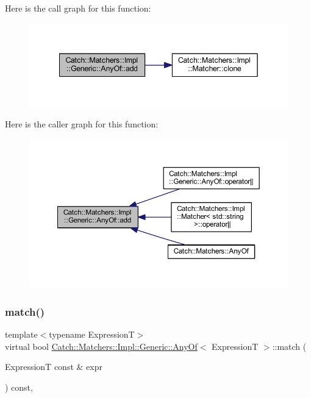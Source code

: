 Here is the call graph for this function\+:\nopagebreak
\begin{figure}[H]
\begin{center}
\leavevmode
\includegraphics[width=342pt]{class_catch_1_1_matchers_1_1_impl_1_1_generic_1_1_any_of_a3bce94b627551e5f96c5f9c6060413f0_cgraph}
\end{center}
\end{figure}
Here is the caller graph for this function\+:\nopagebreak
\begin{figure}[H]
\begin{center}
\leavevmode
\includegraphics[width=350pt]{class_catch_1_1_matchers_1_1_impl_1_1_generic_1_1_any_of_a3bce94b627551e5f96c5f9c6060413f0_icgraph}
\end{center}
\end{figure}
\hypertarget{class_catch_1_1_matchers_1_1_impl_1_1_generic_1_1_any_of_adebd5437cdb8e0d54e16e97fe26e7e85}{}\label{class_catch_1_1_matchers_1_1_impl_1_1_generic_1_1_any_of_adebd5437cdb8e0d54e16e97fe26e7e85} 
\subsubsection{\texorpdfstring{match()}{match()}}
{\footnotesize\ttfamily template$<$typename ExpressionT$>$ \\
virtual bool \hyperlink{class_catch_1_1_matchers_1_1_impl_1_1_generic_1_1_any_of}{Catch\+::\+Matchers\+::\+Impl\+::\+Generic\+::\+Any\+Of}$<$ ExpressionT $>$\+::match (\begin{DoxyParamCaption}\item[{ExpressionT const \&}]{expr }\end{DoxyParamCaption}) const\hspace{0.3cm}{\ttfamily [inline]}, {\ttfamily [virtual]}}



